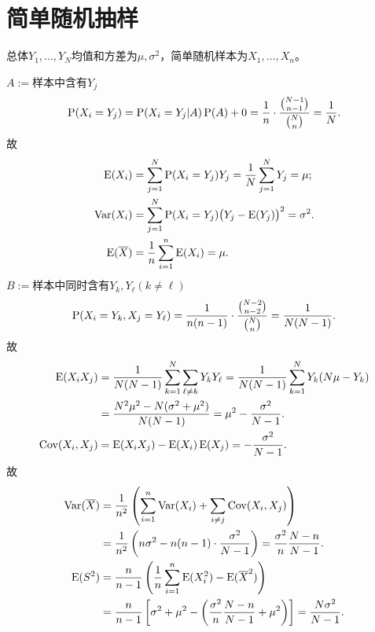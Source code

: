 \section{简单随机抽样}
\label{sec:simple random sampling}

总体$Y_1,\ldots,Y_N$均值和方差为$\mu,\sigma^2$，简单随机样本为$X_1,\ldots,X_n$。

$A:=$样本中含有$Y_j$
\[
	\P(X_i=Y_j)=\P(X_i=Y_j|A)\P(A)+0=\frac1n\cdot\frac{\binom{N-1}{n-1}}{\binom{N}{n}}=\frac1N.
\]
故
\begin{subequations}
	\begin{align}
		\E(X_i)&=\sum_{j=1}^N\P(X_i=Y_j)Y_j=\frac1N\sum_{j=1}^NY_j=\mu;\\
		\Var(X_i)&=\sum_{j=1}^N\P(X_i=Y_j)\bigkh{Y_j-\E(Y_j)}^2=\sigma^2.\\
		\E(\avg X)&=\frac1n\sum_{i=1}^n\E(X_i)=\mu.
	\end{align}
\end{subequations}
$B:=$样本中同时含有$Y_k,Y_\ell(k\neq\ell)$
\[
	\P(X_i=Y_k,X_j=Y_\ell)=\frac1{n(n-1)}\cdot\frac{\binom{N-2}{n-2}}{\binom{N}{n}}=\frac1{N(N-1)}.
\]
故
\begin{align*}
	\E(X_iX_j)&=\frac1{N(N-1)}\sum_{k=1}^N\sum_{\ell\neq k}Y_kY_\ell=\frac1{N(N-1)}\sum_{k=1}^NY_k(N\mu-Y_k)\\
	&=\frac{N^2\mu^2-N(\sigma^2+\mu^2)}{N(N-1)}=\mu^2-\frac{\sigma^2}{N-1}.\\
	\Cov(X_i,X_j)&=\E(X_iX_j)-\E(X_i)\E(X_j)=-\frac{\sigma^2}{N-1}.
\end{align*}
故
\begin{align*}
	\Var(\avg X)&=\frac1{n^2}\kh{\sum_{i=1}^n\Var(X_i)+\sum_{i\neq j}\Cov(X_i,X_j)}\\
	&=\frac1{n^2}\kh{n\sigma^2-n(n-1)\cdot\frac{\sigma^2}{N-1}}=\frac{\sigma^2}n\frac{N-n}{N-1}.\\
	\E(S^2)&=\frac n{n-1}\kh{\frac1n\sum_{i=1}^n\E(X_i^2)-\E(\avg X^2)}\\
	&=\frac n{n-1}\fkh{\sigma^2+\mu^2-\kh{\frac{\sigma^2}n\frac{N-n}{N-1}+\mu^2}}=\frac{N\sigma^2}{N-1}.
\end{align*}
